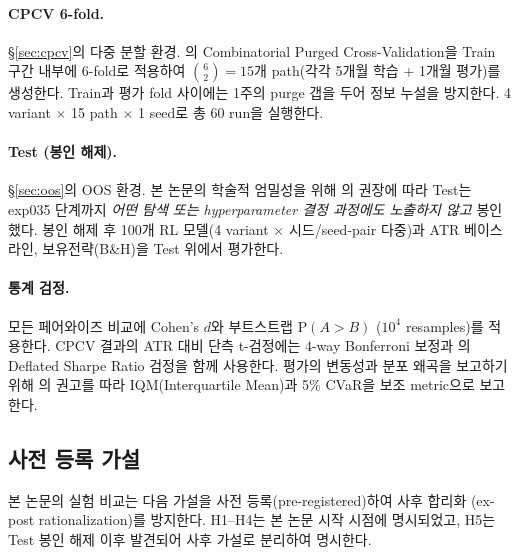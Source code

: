 \documentclass[11pt, a4paper]{article}
\begin{document}
\paragraph{CPCV 6-fold.}
\S\ref{sec:cpcv}의 다중 분할 환경.
\citet{lopezdeprado2018advances}의 Combinatorial Purged Cross-Validation을
Train 구간 내부에 6-fold로 적용하여 $\binom{6}{2}=15$개 path(각각 5개월 학습 +
1개월 평가)를 생성한다. Train과 평가 fold 사이에는 1주의 purge 갭을 두어 정보 누설을
방지한다. 4 variant $\times$ 15 path $\times$ 1 seed로 총 60 run을 실행한다.

\paragraph{Test (봉인 해제).}
\S\ref{sec:oos}의 OOS 환경. 본 논문의 학술적 엄밀성을 위해
\citet{gort2022backtest}의 권장에 따라 Test는 exp035 단계까지 \emph{어떤
탐색 또는 hyperparameter 결정 과정에도 노출하지 않고} 봉인했다. 봉인 해제 후 100개
RL 모델(4 variant $\times$ 시드/seed-pair 다중)과 ATR 베이스라인, 보유전략(B\&H)을
Test 위에서 평가한다.

\paragraph{통계 검정.}
모든 페어와이즈 비교에 Cohen's $d$와 부트스트랩 $\mathrm{P}(A > B)$
($10^4$ resamples)를 적용한다. CPCV 결과의 ATR 대비 단측 t-검정에는
$4$-way Bonferroni 보정과 \citet{lopezdeprado2014dsr}의 Deflated Sharpe Ratio
검정을 함께 사용한다. 평가의 변동성과 분포 왜곡을 보고하기 위해
\citet{henderson2018rlreproducibility}의 권고를 따라 IQM(Interquartile Mean)과
5\% CVaR을 보조 metric으로 보고한다.

\subsection{사전 등록 가설}
\label{sec:hypotheses}

본 논문의 실험 비교는 다음 가설을 사전 등록(pre-registered)하여 사후 합리화
(ex-post rationalization)를 방지한다. H1--H4는 본 논문 시작 시점에 명시되었고,
H5는 Test 봉인 해제 이후 발견되어 사후 가설로 분리하여 명시한다.
\end{document}
